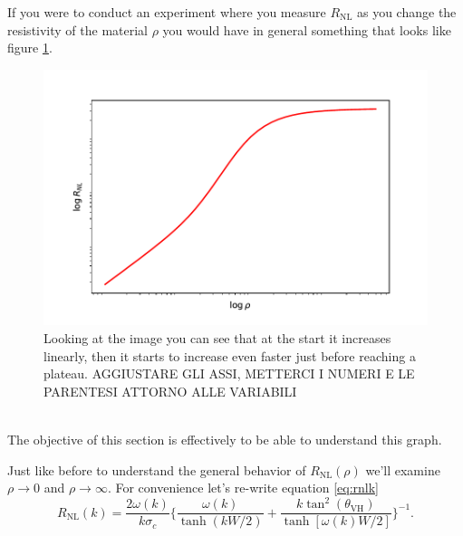If you were to conduct an experiment where you measure $R_{\textrm{NL}}$ as you change the resistivity of the material $\rho$ you would have in general something that looks like figure \ref{fig:rho0}.
\begin{figure}[h!]
    \centering
    \includegraphics[width=\linewidth]{Immagini/rnl/rho0.pdf}
    \caption{Looking at the image you can see that at the start it increases linearly, then it starts to increase even faster just before reaching a plateau. AGGIUSTARE GLI ASSI, METTERCI I NUMERI E LE PARENTESI ATTORNO ALLE VARIABILI}
    \label{fig:rho0}
\end{figure}\\
The objective of this section is effectively to be able to understand this graph.

Just like before to understand the general behavior of $R_{\textrm{NL}}(\rho)$ we'll examine $\rho\to 0$ and $\rho \to \infty$. For convenience let's re-write equation \ref{eq:rnlk}
\[
    R_{\textrm{NL}}(k)=\frac{2\omega(k)}{k\sigma_c}
    \bigg\{
        \frac{\omega(k)}{\tanh(kW/2)} + \frac{k\tan^2(\theta_{\textrm{VH}})}{\tanh[\omega(k)W/2]}    
    \bigg\}^{-1}.
\]
















